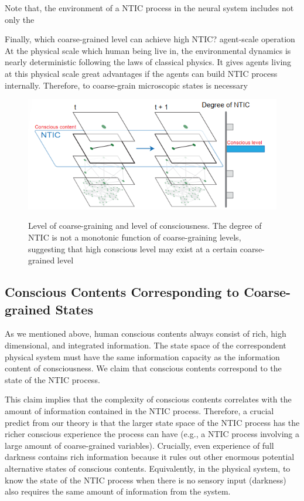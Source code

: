 \documentclass[utf8]{article}
\begin{document}
	    Note that, the environment of a NTIC process in the neural system includes not only the
        
        Finally, which coarse-grained level can achieve high NTIC? 
        agent-scale operation
        At the physical scale which human being live in, the environmental dynamics is nearly deterministic following the laws of classical physics. It gives agents living at this physical scale great advantages if the agents can build NTIC process internally. Therefore, to coarse-grain microscopic states is necessary
	   
			
		\begin{figure}[H]				
    		\includegraphics[width=\textwidth]{WritingMaterials/Fig_temp/FoxitReader_2019-01-31_19-03-59.png}
    		\label{fig:LevelOfConsciousness}
    		\caption{Level of coarse-graining and level of consciousness. The degree of NTIC is not a monotonic function of coarse-graining levels, suggesting that high conscious level may exist at a certain coarse-grained level }
		\end{figure}


        
		\subsection{Conscious Contents Corresponding to Coarse-grained States}
        As we mentioned above, human conscious contents always consist of rich,  high dimensional, and integrated information. The state space of the correspondent physical system must have the same information capacity as the information content of consciousness.  We claim that conscious contents correspond to the state of the NTIC process. 
        
        This claim implies that the complexity of conscious contents correlates with the amount of information contained in the NTIC process. Therefore, a crucial predict from our theory is that the larger state space of the NTIC process has the richer conscious experience the process can have (e.g., a NTIC process involving a large amount of coarse-grained variables). Crucially, even experience of full darkness contains rich information because it rules out other enormous potential alternative states of conscious contents. Equivalently, in the physical system, to know the state of the NTIC process when there is no sensory input (darkness) also requires the same amount of information from the system. 
        
\end{document}
